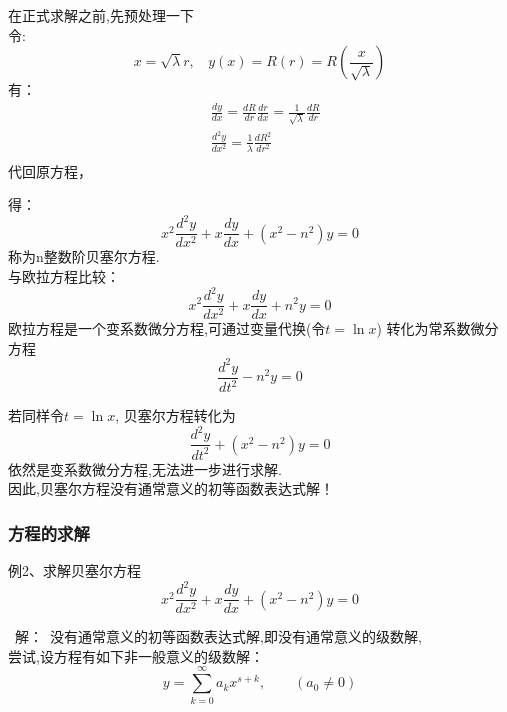 \begin{frame}	
	在正式求解之前,先预处理一下\\
	令:
	\begin{equation*}
		x=\sqrt{\lambda} r, ~~~~y(x)= R(r) =R(\frac{x}{\sqrt{\lambda}})
	\end{equation*}
	有： 
	\[
	\begin{aligned}
		&\frac{dy}{dx} = \frac{dR}{dr} \frac{dr}{dx} = \frac{1}{ \sqrt{\lambda}} \frac{dR}{dr}\\
		&\frac{d^2y}{dx^2} = \frac{1}{\lambda} \frac{dR^2}{dr^2}\\
	\end{aligned}	
	\]
	代回原方程，
\end{frame}	

\begin{frame}
	得：
	\begin{equation*}
		\boxed{x^2\frac{d^2y}{dx^2} + x\frac{dy}{dx} +(x^2 -n^2)y=0}
	\end{equation*}
	称为n整数阶贝塞尔方程.\\ \vspace{1em}
	{\Bullet}与欧拉方程比较：
	\begin{equation*}
		x^2\frac{d^2y}{dx^2} + x\frac{dy}{dx} +n^2y=0
	\end{equation*}
	欧拉方程是一个变系数微分方程,可通过变量代换(令$t=\ln x $) 转化为常系数微分方程
	\[ \frac{d^2y}{dt^2} - n^2y=0 \]
\end{frame}	

\begin{frame}
	若同样令$t=\ln x $, 贝塞尔方程转化为 
	\[ \frac{d^2y}{dt^2} +(x^2-n^2)y=0 \]
	依然是变系数微分方程,无法进一步进行求解.\\
	因此,贝塞尔方程没有通常意义的初等函数表达式解！
\end{frame}	

\begin{frame}
	\frametitle{方程的求解}
	\begin{exampleblock} {例2、求解贝塞尔方程}
		\begin{equation*}
			x^2\frac{d^2y}{dx^2} + x\frac{dy}{dx} +( x^2 -n^2)y=0
		\end{equation*}	
	\end{exampleblock}
	\alert{ 解：}~没有通常意义的初等函数表达式解,即没有通常意义的级数解,\\
	尝试,设方程有如下非一般意义的级数解：
	\begin{equation*}
		y=\sum\limits_{k=0}^{\infty} a_k x^{s+k},  \qquad (a_0 \not =0)
	\end{equation*}	
\end{frame}	

